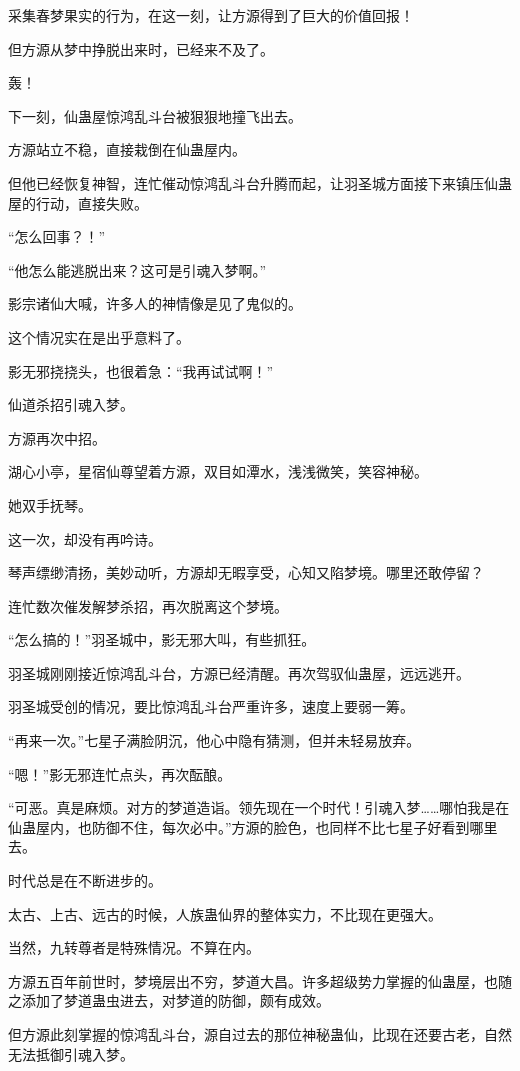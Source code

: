 \begin{this_body}
采集春梦果实的行为，在这一刻，让方源得到了巨大的价值回报！

但方源从梦中挣脱出来时，已经来不及了。

轰！

下一刻，仙蛊屋惊鸿乱斗台被狠狠地撞飞出去。

方源站立不稳，直接栽倒在仙蛊屋内。

但他已经恢复神智，连忙催动惊鸿乱斗台升腾而起，让羽圣城方面接下来镇压仙蛊屋的行动，直接失败。

“怎么回事？！”

“他怎么能逃脱出来？这可是引魂入梦啊。”

影宗诸仙大喊，许多人的神情像是见了鬼似的。

这个情况实在是出乎意料了。

影无邪挠挠头，也很着急：“我再试试啊！”

仙道杀招引魂入梦。

方源再次中招。

湖心小亭，星宿仙尊望着方源，双目如潭水，浅浅微笑，笑容神秘。

她双手抚琴。

这一次，却没有再吟诗。

琴声缥缈清扬，美妙动听，方源却无暇享受，心知又陷梦境。哪里还敢停留？

连忙数次催发解梦杀招，再次脱离这个梦境。

“怎么搞的！”羽圣城中，影无邪大叫，有些抓狂。

羽圣城刚刚接近惊鸿乱斗台，方源已经清醒。再次驾驭仙蛊屋，远远逃开。

羽圣城受创的情况，要比惊鸿乱斗台严重许多，速度上要弱一筹。

“再来一次。”七星子满脸阴沉，他心中隐有猜测，但并未轻易放弃。

“嗯！”影无邪连忙点头，再次酝酿。

“可恶。真是麻烦。对方的梦道造诣。领先现在一个时代！引魂入梦……哪怕我是在仙蛊屋内，也防御不住，每次必中。”方源的脸色，也同样不比七星子好看到哪里去。

时代总是在不断进步的。

太古、上古、远古的时候，人族蛊仙界的整体实力，不比现在更强大。

当然，九转尊者是特殊情况。不算在内。

方源五百年前世时，梦境层出不穷，梦道大昌。许多超级势力掌握的仙蛊屋，也随之添加了梦道蛊虫进去，对梦道的防御，颇有成效。

但方源此刻掌握的惊鸿乱斗台，源自过去的那位神秘蛊仙，比现在还要古老，自然无法抵御引魂入梦。


\end{this_body}
